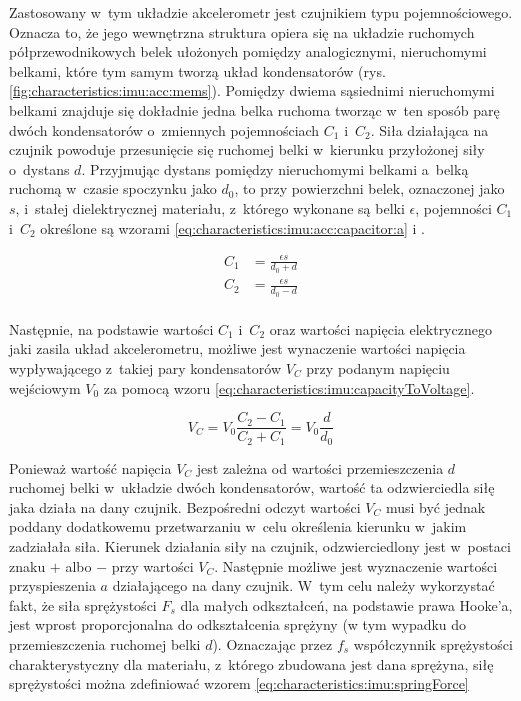 																																											
Zastosowany w~tym układzie akcelerometr jest czujnikiem typu pojemnościowego. Oznacza to, że jego wewnętrzna struktura opiera się na układzie ruchomych półprzewodnikowych belek ułożonych pomiędzy analogicznymi, nieruchomymi belkami, które tym samym tworzą układ kondensatorów (rys. \ref{fig:characteristics:imu:acc:mems}). Pomiędzy dwiema sąsiednimi nieruchomymi belkami znajduje się dokładnie jedna belka ruchoma tworząc w~ten sposób parę dwóch kondensatorów o~zmiennych pojemnościach $C_1$ i~$C_2$. Siła działająca na czujnik powoduje przesunięcie się ruchomej belki w~kierunku przyłożonej siły o~dystans $d$. Przyjmując dystans pomiędzy nieruchomymi belkami a~belką ruchomą w~czasie spoczynku jako $d_0$, to przy powierzchni belek, oznaczonej jako $s$, i~stałej dielektrycznej materiału, z~którego wykonane są belki $\epsilon$, pojemności $C_1$ i~$C_2$ określone są wzorami \ref{eq:characteristics:imu:acc:capacitor:a} i \label{eq:characteristics:imu:acc:capacitor:b} .
																																												
\begin{subequations}
	\begin{align}
		C_1 & = \frac{\epsilon s}{d_0 + d}\label{eq:characteristics:imu:acc:capacitor:a} \\ 
		C_2 & = \frac{\epsilon s}{d_0 - d}\label{eq:characteristics:imu:acc:capacitor:b} \\		
	\end{align}
\end{subequations}
																																												
Następnie, na podstawie wartości $C_1$ i~$C_2$ oraz wartości napięcia elektrycznego jaki zasila układ akcelerometru, możliwe jest wynaczenie wartości napięcia wypływającego z~takiej pary kondensatorów $V_C$ przy podanym napięciu wejściowym $V_0$ za pomocą wzoru \ref{eq:characteristics:imu:capacityToVoltage}.
																																											
\begin{equation}
	V_C = V_0 \frac{C_2-C_1}{C_2+C_1} = V_0\frac{d}{d_0}
	\label{eq:characteristics:imu:capacityToVoltage}
\end{equation}
																																												
Ponieważ wartość napięcia $V_C$ jest zależna od wartości przemieszczenia $d$ ruchomej belki w~układzie dwóch kondensatorów, wartość ta odzwierciedla siłę jaka działa na dany czujnik. Bezpośredni odczyt wartości $V_C$ musi być jednak poddany dodatkowemu przetwarzaniu w~celu określenia kierunku w~jakim zadziałała siła. Kierunek działania siły na czujnik, odzwierciedlony jest w~postaci znaku $+$ albo $-$ przy wartości $V_C$. Następnie możliwe jest wyznaczenie wartości przyspieszenia $a$ działającego na dany czujnik. W~tym celu należy wykorzystać fakt, że siła sprężystości $F_s$ dla małych odkształceń, na podstawie prawa Hooke'a, jest wprost proporcjonalna do odkształcenia sprężyny (w tym wypadku do przemieszczenia ruchomej belki $d$). Oznaczając przez $f_s$ współczynnik sprężystości charakterystyczny dla materiału, z~którego zbudowana jest dana sprężyna, siłę sprężystości można zdefiniować wzorem \ref{eq:characteristics:imu:springForce}
																																											
